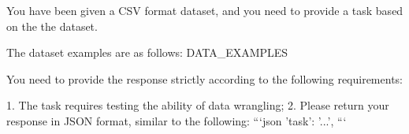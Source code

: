 \begin{tcolorbox}[colback=cadmiumgreen!5!white,colframe=forestgreen!75!white,breakable,title=\textit{Prompt for task construction in data wrangling.}]
\begin{VerbatimWrap}
You have been given a CSV format dataset, and you need to provide a task based on the the dataset.
    
The dataset examples are as follows:
{{DATA_EXAMPLES}}

You need to provide the response strictly according to the following requirements:

1. The task requires testing the ability of data wrangling;
2. Please return your response in JSON format, similar to the following:
```json
{
    'task': '...',
}
```
\end{VerbatimWrap}
\end{tcolorbox}
